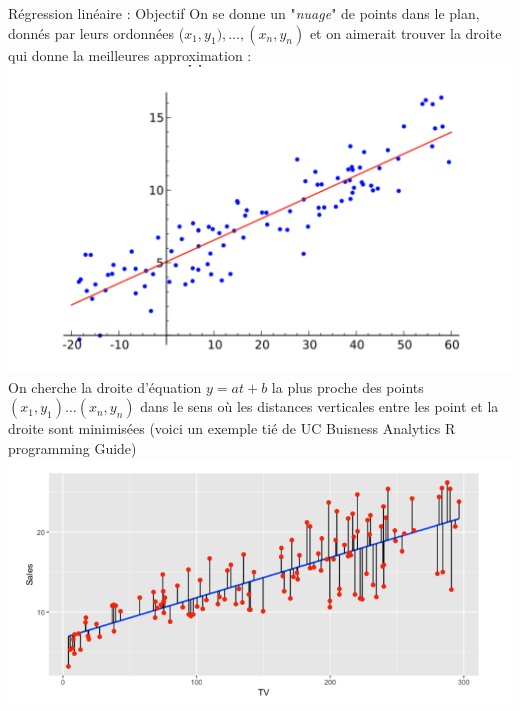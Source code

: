         \begin{parag}{Régression linéaire : Objectif}
            On se donne un "\textit{nuage}" de points dans le plan, donnés par leurs ordonnées ($x_1, y_1), \dots, (x_n, y_n)$ et on aimerait trouver la droite qui donne la meilleures approximation :
            \includegraphics[scale=0.3]{Algèbre linéàaire/Screenshot 2024-12-10 153727.png}
            On cherche la droite d'équation $y = at + b$ la plus proche des points $(x_1, y_1)\dots (x_n, y_n)$ dans le sens où les distances verticales entre les point et la droite sont minimisées (voici un exemple tié de UC Buisness Analytics R programming Guide)
            \includegraphics[scale = 0.5]{Algèbre linéàaire/Screenshot 2024-12-10 153930.png}
        \end{parag}
